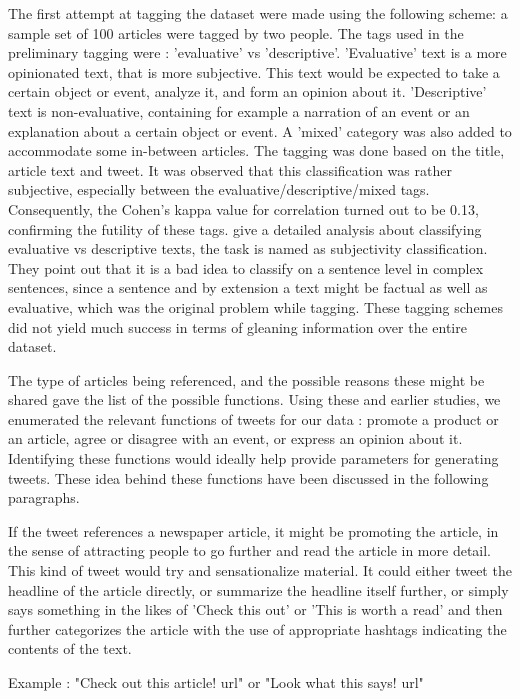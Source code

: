 The first attempt at tagging the dataset were made using the following scheme: a sample set of 100 articles were tagged by two people. The tags used in the preliminary tagging were : 'evaluative' vs 'descriptive'. 'Evaluative' text is a more opinionated text, that is more subjective. This text would be expected to take a certain object or event, analyze it,  and form an opinion about it. 'Descriptive' text is non-evaluative, containing for example a narration of an event or an explanation about a certain object or event. A 'mixed' category was also added to accommodate some in-between articles. The tagging was done based on the title, article text and tweet. It was observed that this classification was rather subjective, especially between the evaluative/descriptive/mixed tags. Consequently, the Cohen's kappa value for correlation turned out to be 0.13, confirming the futility of these tags. \cite{liu2012survey} give a detailed analysis about classifying evaluative vs descriptive texts, the task is named as subjectivity classification. They point out that it is a bad idea to classify on a sentence level in complex sentences, since a sentence and by extension a text might be factual as well as evaluative, which was the original problem while tagging. These tagging schemes did not yield much success in terms of gleaning information over the entire dataset.

The type of articles being referenced, and the possible reasons these might be shared gave the list of the possible functions. Using these and earlier studies, we enumerated the relevant functions of tweets for our data : promote a product or an article, agree or disagree with an event, or express an opinion about it. Identifying these functions would ideally help provide parameters for generating tweets. These idea behind these functions have been discussed in the following paragraphs. 

If the tweet references a newspaper article, it might be promoting the article, in the sense of attracting people to go further and read the article in more detail. This kind of tweet would try and sensationalize material. It could either tweet the headline of the article directly, or summarize the headline itself further, or simply says something in the likes of 'Check this out' or 'This is worth a read' and then further categorizes the article with the use of appropriate hashtags indicating the contents of the text.

Example : "Check out this article! {url}" or "Look what this says! {url}"

